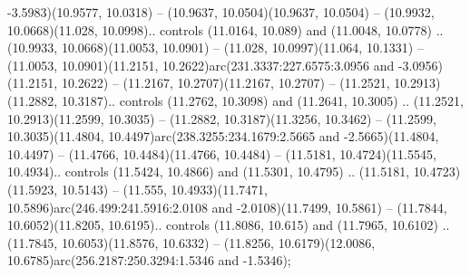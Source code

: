 -3.5983)(10.9577, 10.0318) -- (10.9637, 10.0504)(10.9637, 10.0504) -- (10.9932, 10.0668)(11.028, 10.0998).. controls (11.0164, 10.089) and (11.0048, 10.0778) .. (10.9933, 10.0668)(11.0053, 10.0901) -- (11.028, 10.0997)(11.064, 10.1331) -- (11.0053, 10.0901)(11.2151, 10.2622)arc(231.3337:227.6575:3.0956 and -3.0956)(11.2151, 10.2622) -- (11.2167, 10.2707)(11.2167, 10.2707) -- (11.2521, 10.2913)(11.2882, 10.3187).. controls (11.2762, 10.3098) and (11.2641, 10.3005) .. (11.2521, 10.2913)(11.2599, 10.3035) -- (11.2882, 10.3187)(11.3256, 10.3462) -- (11.2599, 10.3035)(11.4804, 10.4497)arc(238.3255:234.1679:2.5665 and -2.5665)(11.4804, 10.4497) -- (11.4766, 10.4484)(11.4766, 10.4484) -- (11.5181, 10.4724)(11.5545, 10.4934).. controls (11.5424, 10.4866) and (11.5301, 10.4795) .. (11.5181, 10.4723)(11.5923, 10.5143) -- (11.555, 10.4933)(11.7471, 10.5896)arc(246.499:241.5916:2.0108 and -2.0108)(11.7499, 10.5861) -- (11.7844, 10.6052)(11.8205, 10.6195).. controls (11.8086, 10.615) and (11.7965, 10.6102) .. (11.7845, 10.6053)(11.8576, 10.6332) -- (11.8256, 10.6179)(12.0086, 10.6785)arc(256.2187:250.3294:1.5346 and -1.5346);



